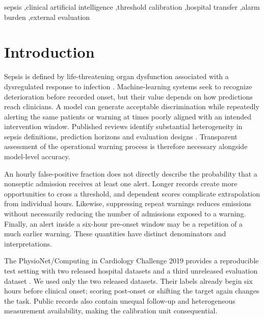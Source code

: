 \documentclass[preprint,12pt]{elsarticle}
\begin{document}
\begin{frontmatter}
\begin{abstract}
\begin{singlespace}
\textbf{Conclusions:} Local admission calibration can align false-alert exposure with a nominal operating target, but neither reliable threshold transport nor adequate external case detection was established. Admission exposure, repeated emissions and first-warning timing should be reported together. These results support an evaluation framework, not a clinically validated sepsis intervention.
\end{singlespace}
\end{abstract}
\begin{keyword}
sepsis \sep clinical artificial intelligence \sep threshold calibration \sep hospital transfer \sep alarm burden \sep external evaluation
\end{keyword}
\end{frontmatter}
\newpage

\section{Introduction}
Sepsis is defined by life-threatening organ dysfunction associated with a dysregulated response to infection \cite{singer}. Machine-learning systems seek to recognize deterioration before recorded onset, but their value depends on how predictions reach clinicians. A model can generate acceptable discrimination while repeatedly alerting the same patients or warning at times poorly aligned with an intended intervention window. Published reviews identify substantial heterogeneity in sepsis definitions, prediction horizons and evaluation designs \cite{fleuren}. Transparent assessment of the operational warning process is therefore necessary alongside model-level accuracy.

An hourly false-positive fraction does not directly describe the probability that a nonseptic admission receives at least one alert. Longer records create more opportunities to cross a threshold, and dependent scores complicate extrapolation from individual hours. Likewise, suppressing repeat warnings reduces emissions without necessarily reducing the number of admissions exposed to a warning. Finally, an alert inside a six-hour pre-onset window may be a repetition of a much earlier warning. These quantities have distinct denominators and interpretations.

The PhysioNet/Computing in Cardiology Challenge 2019 provides a reproducible test setting with two released hospital datasets and a third unreleased evaluation dataset \cite{reyna,reynadata}. We used only the two released datasets. Their labels already begin six hours before clinical onset; scoring post-onset or shifting the target again changes the task. Public records also contain unequal follow-up and heterogeneous measurement availability, making the calibration unit consequential.
\end{document}

